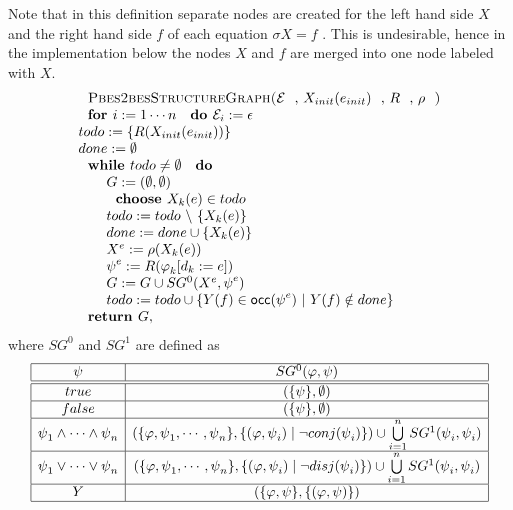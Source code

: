 Note that in this definition separate nodes are created for the left hand
side $X$ and the right hand side $f$ of each equation $\sigma X=f$ . This is
undesirable, hence in the implementation below the nodes $X$ and $f$ are
merged into one node labeled with $X$.%
\begin{equation*}
\begin{array}{l}
\text{\textsc{Pbes2besStructureGraph(}}\mathcal{E}\text{, }X_{init}(e_{init})%
\text{, }R\text{, }\rho \text{\textsc{)}} \\ 
\text{\textbf{for }}i:=1\cdots n\text{ \textbf{do }}\mathcal{E}%
_{i}:=\epsilon  \\ 
todo:=\{R(X_{init}(e_{init}))\} \\ 
done:=\emptyset  \\ 
\text{\textbf{while }}todo\neq \emptyset \text{ \textbf{do}} \\ 
\qquad G:=(\emptyset ,\emptyset ) \\ 
\qquad \text{\textbf{choose }}X_{k}(e)\in todo \\ 
\qquad todo:=todo\ \backslash \ \{X_{k}(e)\} \\ 
\qquad done:=done\cup \{X_{k}(e)\} \\ 
\qquad X^{e}:=\rho (X_{k}(e)) \\ 
\qquad \psi ^{e}:=R(\varphi _{k}[d_{k}:=e]) \\ 
\qquad G:=G\cup SG^{0}(X^{e},\psi ^{e}) \\ 
\qquad todo:=todo\cup \{Y(f)\in \mathsf{occ}(\psi ^{e})\ |\ Y(f)\notin done\}
\\ 
\text{\textbf{return }}G,%
\end{array}%
\end{equation*}%
where $SG^{0}$ and $SG^{1}$ are defined as%
\begin{equation*}
\begin{array}{|c|c|}
\hline
\psi  & SG^{0}(\varphi ,\psi ) \\ \hline\hline
true & (\{\psi \},\emptyset ) \\ \hline
false & (\{\psi \},\emptyset ) \\ \hline
\psi _{1}\wedge \cdots \wedge \psi _{n} & \left( \{\varphi ,\psi _{1},\cdots
,\psi _{n}\},\{(\varphi ,\psi _{i})\mid \lnot conj(\psi _{i})\}\right) \cup
\bigcup\limits_{i=1}^{n}SG^{1}(\psi _{i},\psi _{i}) \\ \hline
\psi _{1}\vee \cdots \vee \psi _{n} & \left( \{\varphi ,\psi _{1},\cdots
,\psi _{n}\},\{(\varphi ,\psi _{i})\mid \lnot disj(\psi _{i})\}\right) \cup
\bigcup\limits_{i=1}^{n}SG^{1}(\psi _{i},\psi _{i}) \\ \hline
Y & (\{\varphi ,\psi \},\{(\varphi ,\psi )\}) \\ \hline
\end{array}%
\end{equation*}%
